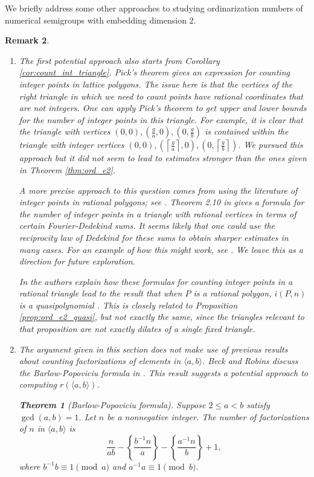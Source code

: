 \documentclass[12pt]{amsart}
\theoremstyle{plain}\newtheorem{proposition}{Proposition}[section]
\newtheorem{thm}[proposition]{Theorem}
\newtheorem{remark}[proposition]{Remark}
\begin{document}
We briefly address some other approaches to studying ordinarization numbers of numerical semigroups with embedding dimension $2$.
\begin{remark}
\begin{enumerate}[leftmargin=*]
\item The first potential approach also starts from Corollary \ref{cor:count_int_triangle}.  Pick's theorem gives an expression for counting integer points in lattice polygons.  The issue here is that the vertices of the right triangle in which we need to count points have \emph{rational} coordinates that are not integers.  One can apply Pick's theorem to get upper and lower bounds for the number of integer points in this triangle.  For example, it is clear that the triangle with vertices $(0,0), \left(\frac{g}{a},0\right), \left(0,\frac{g}{b}\right)$ is contained within the triangle with integer vertices $(0,0), \left(\left\lceil\frac{g}{a}\right\rceil,0\right), \left(0,\left\lceil\frac{g}{b}\right\rceil\right)$.  We pursued this approach but it did not seem to lead to estimates stronger than the ones given in Theorem \ref{thm:ord_e2}.

A more precise approach to this question comes from using the literature of integer points in rational polygons; see \cite[Section 2.7]{BeckRobins}.  Theorem 2.10 in \cite{BeckRobins} gives a formula for the number of integer points in a triangle with rational vertices in terms of certain Fourier-Dedekind sums.  It seems likely that one could use the reciprocity law of Dedekind for these sums \cite[Theorem 4]{BeckRobinsZacks} to obtain sharper estimates in many cases.  For an example of how this might work, see \cite[Section 4]{BeckRobinsZacks}.  We leave this as a direction for future exploration.

In \cite[Section 2.7]{BeckRobins} the authors explain how these formulas for counting integer points in a rational triangle lead to the result that when $P$ is a rational polygon, $i(P,n)$ is a quasipolynomial \cite[Theorem 2.11]{BeckRobins}.  This is closely related to Proposition \ref{prop:ord_e2_quasi}, but not exactly the same, since the triangles relevant to that proposition are not exactly dilates of a single fixed triangle.

\item The argument given in this section does not make use of previous results about counting factorizations of elements in $\langle a,b\rangle$.  Beck and Robins discuss the \emph{Barlow-Popoviciu formula} in \cite[Section 1.3]{BeckRobins}.  This result suggests a potential approach to computing $r(\langle a,b\rangle)$.
\begin{thm}[Barlow-Popoviciu formula]
Suppose $2\le a < b$ satisfy $\gcd(a,b) = 1$. Let $n$ be a nonnegative integer.  The number of factorizations of $n$ in $\langle a,b\rangle$ is 
\[
\frac{n}{ab} - \left\{\frac{b^{-1} n}{a} \right\} - \left\{\frac{a^{-1} n}{b} \right\} + 1,
\]
where $b^{-1} b \equiv 1 \pmod{a}$ and $a^{-1} a \equiv 1 \pmod{b}$.
\end{thm}


\end{enumerate}
\end{remark}
\end{document}
